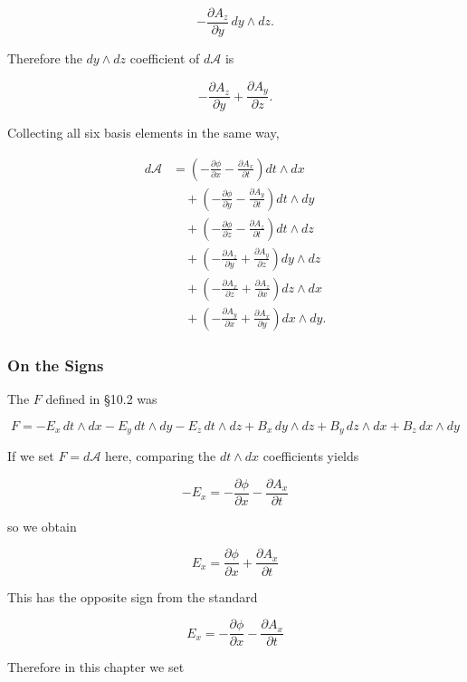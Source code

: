 \documentclass[a4paper,12pt,openany]{book}
\begin{document}
\[
-\frac{\partial A_z}{\partial y}\,dy\wedge dz.
\]

Therefore the \(dy\wedge dz\) coefficient of \(d\mathcal{A}\) is

\[
-\frac{\partial A_z}{\partial y}
+
\frac{\partial A_y}{\partial z}.
\]

Collecting all six basis elements in the same way,

\[
\begin{aligned}
d\mathcal{A}
&=
\left(
-\frac{\partial\phi}{\partial x}
-
\frac{\partial A_x}{\partial t}
\right)
dt\wedge dx
\\[0.5em]
&\quad+
\left(
-\frac{\partial\phi}{\partial y}
-
\frac{\partial A_y}{\partial t}
\right)
dt\wedge dy
\\[0.5em]
&\quad+
\left(
-\frac{\partial\phi}{\partial z}
-
\frac{\partial A_z}{\partial t}
\right)
dt\wedge dz
\\[0.5em]
&\quad+
\left(
-\frac{\partial A_z}{\partial y}
+
\frac{\partial A_y}{\partial z}
\right)
dy\wedge dz
\\[0.5em]
&\quad+
\left(
-\frac{\partial A_x}{\partial z}
+
\frac{\partial A_z}{\partial x}
\right)
dz\wedge dx
\\[0.5em]
&\quad+
\left(
-\frac{\partial A_y}{\partial x}
+
\frac{\partial A_x}{\partial y}
\right)
dx\wedge dy.
\end{aligned}
\]

\hypertarget{on-the-signs}{%
\subsubsection{On the Signs}\label{on-the-signs}}

The \(F\) defined in §10.2 was

\[
F
=
-E_x\,dt\wedge dx
-
E_y\,dt\wedge dy
-
E_z\,dt\wedge dz
+
B_x\,dy\wedge dz
+
B_y\,dz\wedge dx
+
B_z\,dx\wedge dy
\]

If we set \(F=d\mathcal{A}\) here, comparing the \(dt\wedge dx\)
coefficients yields

\[
-E_x
=
-\frac{\partial\phi}{\partial x}
-
\frac{\partial A_x}{\partial t}
\]

so we obtain

\[
E_x
=
\frac{\partial\phi}{\partial x}
+
\frac{\partial A_x}{\partial t}
\]

This has the opposite sign from the standard

\[
E_x
=
-\frac{\partial\phi}{\partial x}
-
\frac{\partial A_x}{\partial t}
\]

Therefore in this chapter we set
\end{document}
